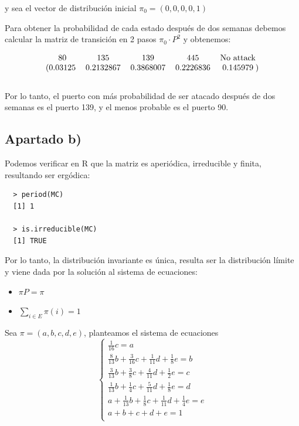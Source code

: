 \documentclass[11pt]{article}
\begin{document}
y sea el vector de distribución inicial $\pi_0 = (0, 0, 0, 0, 1)$

Para obtener la probabilidad de cada estado después de dos semanas debemos calcular
la matriz de transición en 2 pasos $\pi_0 \cdot P^2$ y obtenemos:

\begin{equation*}
  \begin{blockarray}{ccccc}
    80 & 135 & 139 & 445 & \text{No attack} \\
    \begin{block}{(ccccc)}
      0.03125 & 0.2132867 & 0.3868007 & 0.2226836 & 0.145979 \\
    \end{block}
  \end{blockarray}
\end{equation*}

Por lo tanto, el puerto con más probabilidad de ser atacado después de dos semanas
es el puerto 139, y el menos probable es el puerto 90.


\subsection*{Apartado b)}

Podemos verificar en R que la matriz es aperiódica, irreducible y finita, 
resultando ser ergódica:

\begin{verbatim}
  > period(MC)
  [1] 1

  > is.irreducible(MC)
  [1] TRUE  
\end{verbatim}

Por lo tanto, la distribución invariante es única, resulta ser la distribución
límite y viene dada por la solución al sistema de ecuaciones:

\begin{itemize}
  \item $\pi P = \pi$
  \item $\displaystyle\sum_{i \in E} \pi(i) = 1$
\end{itemize}

Sea $ \pi = (a, b, c, d, e) $, planteamos el sistema de ecuaciones
\[
\begin{cases}
  \frac{1}{16}c = a \\
  \frac{8}{13}b + \frac{3}{16}c + \frac{1}{11}d + \frac{1}{8}e = b \\
  \frac{3}{13}b + \frac{3}{8}c + \frac{4}{11}d + \frac{1}{2}e = c \\
  \frac{1}{13}b + \frac{1}{4}c + \frac{5}{11}d + \frac{1}{8}e = d \\
  a + \frac{1}{13}b + \frac{1}{8}c + \frac{1}{11}d + \frac{1}{4}e = e \\
  a + b + c + d + e = 1 \\
\end{cases}
\]
\end{document}
